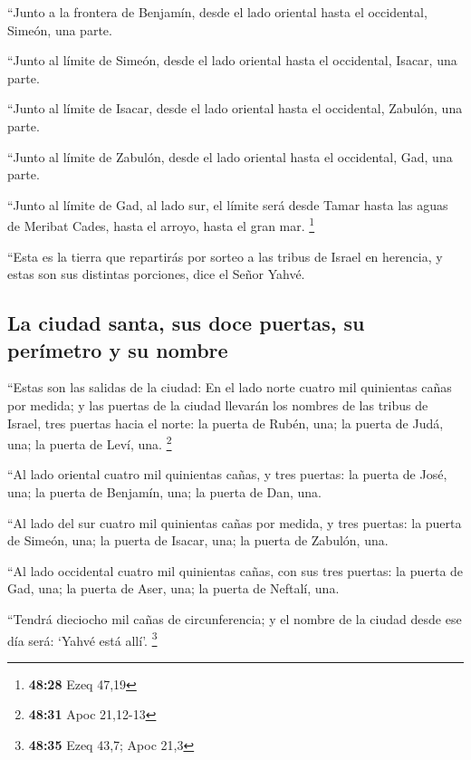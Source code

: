 ``Junto a la frontera de Benjamín, desde el lado
oriental hasta el occidental, Simeón, una parte.

 ``Junto al límite de Simeón, desde el lado oriental
hasta el occidental, Isacar, una parte.

 ``Junto al límite de Isacar, desde el lado oriental
hasta el occidental, Zabulón, una parte.

 ``Junto al límite de Zabulón, desde el lado oriental
hasta el occidental, Gad, una parte.

 ``Junto al límite de Gad, al lado sur, el límite será
desde Tamar hasta las aguas de Meribat Cades, hasta el arroyo, hasta el
gran mar. \footnote{\textbf{48:28} Ezeq 47,19}

 ``Esta es la tierra que repartirás por sorteo a las
tribus de Israel en herencia, y estas son sus distintas porciones, dice
el Señor Yahvé.

\hypertarget{la-ciudad-santa-sus-doce-puertas-su-peruxedmetro-y-su-nombre}{%
\subsection{La ciudad santa, sus doce puertas, su perímetro y su
nombre}\label{la-ciudad-santa-sus-doce-puertas-su-peruxedmetro-y-su-nombre}}

 ``Estas son las salidas de la ciudad: En el lado norte
cuatro mil quinientas cañas por medida;  y las puertas de
la ciudad llevarán los nombres de las tribus de Israel, tres puertas
hacia el norte: la puerta de Rubén, una; la puerta de Judá, una; la
puerta de Leví, una. \footnote{\textbf{48:31} Apoc 21,12-13}

 ``Al lado oriental cuatro mil quinientas cañas, y tres
puertas: la puerta de José, una; la puerta de Benjamín, una; la puerta
de Dan, una.

 ``Al lado del sur cuatro mil quinientas cañas por
medida, y tres puertas: la puerta de Simeón, una; la puerta de Isacar,
una; la puerta de Zabulón, una.

 ``Al lado occidental cuatro mil quinientas cañas, con
sus tres puertas: la puerta de Gad, una; la puerta de Aser, una; la
puerta de Neftalí, una.

 ``Tendrá dieciocho mil cañas de circunferencia; y el
nombre de la ciudad desde ese día será: `Yahvé está allí'. \footnote{\textbf{48:35}
  Ezeq 43,7; Apoc 21,3}
